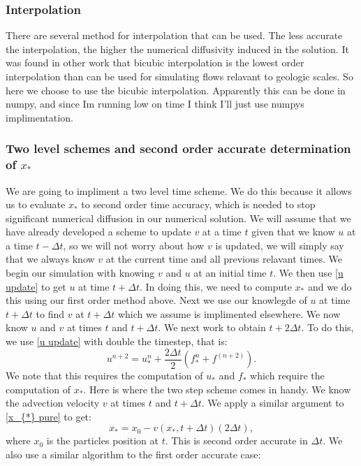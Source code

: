 \documentclass{article}
\begin{document}
\subsubsection*{Interpolation}
There are several method for interpolation that can be used. The less accurate the interpolation, the higher the numerical diffusivity induced in the solution. It was found in other work that bicubic interpolation is the lowest order interpolation than can be used for simulating flows relavant to geologic scales. So here we choose to use the bicubic interpolation. Apparently this can be done in numpy, and since Im running low on time I think I'll just use numpys implimentation.


\subsubsection*{Two level schemes and second order accurate determination of $x_{*}$}
We are going to impliment a two level time scheme. We do this because it allows us to evaluate $x_{*}$ to second order time accuracy, which is needed to stop significant numerical diffusion in our numerical solution. We will assume that we have already developed a scheme to update $v$ at a time $t$ given that we know $u$ at a time $t-\Delta t$, so we will not worry about how $v$ is updated, we will simply say that we always know $v$ at the current time and all previous relavant times. We begin our simulation with knowing $v$ and $u$ at an initial time $t$. We then use \ref{u update} to get $u$ at time $t+\Delta t$. In doing this, we need to compute $x_{*}$ and we do this using our first order method above. Next we use our knowlegde of $u$ at time $t+\Delta t$ to find $v$ at $t+\Delta t$ which we assume is implimented elsewhere. We now know $u$ and $v$ at times $t$ and $t+\Delta t$. We next work to obtain $t+2 \Delta t$. To do this, we use \ref{u update} with double the timestep, that is:
\begin{equation}
	u^{n+2} = u^{n}_{*} +  \frac{2 \Delta t}{2} (f^{n}_{*} + f^{(n+2)} ).
\end{equation}
We note that this requires the computation of $u_{*}$ and $f_{*}$ which require the computation of $x_{*}$. Here is where the two step scheme comes in handy. We know the advection velocity $v$ at times $t$ and $t+\Delta t$. We apply a similar argument to \ref{x_{*} pure} to get:
\begin{equation}
	x_{*} = x_0 - v(x_{*}, t + \Delta t) (2 \Delta t),
\end{equation}
where $x_0$ is the particles position at $t$. This is second order accurate in $\Delta t$. We also use a similar algorithm to the first order accurate case:
\end{document}
